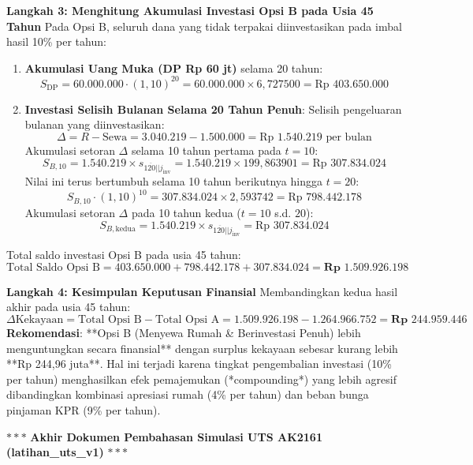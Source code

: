 \documentclass[11pt,a4paper]{article}
\newcommand{\angl}[1]{\overline{#1|}}
\begin{document}
\begin{solusibox}[6]
\textbf{Langkah 3: Menghitung Akumulasi Investasi Opsi B pada Usia 45 Tahun}  
Pada Opsi B, seluruh dana yang tidak terpakai diinvestasikan pada imbal hasil 10\% per tahun:
\begin{enumerate}[leftmargin=4mm, topsep=1pt, itemsep=1pt]
    \item \textbf{Akumulasi Uang Muka (DP Rp 60 jt)} selama 20 tahun:
    $$S_{\text{DP}} = 60.000.000 \cdot (1{,}10)^{20} = 60.000.000 \times 6{,}727500 = \text{Rp } 403.650.000$$
    \item \textbf{Investasi Selisih Bulanan Selama 20 Tahun Penuh}:  
    Selisih pengeluaran bulanan yang diinvestasikan:
    $$\Delta = R - \text{Sewa} = 3.040.219 - 1.500.000 = \text{Rp } 1.540.219 \text{ per bulan}$$
    Akumulasi setoran $\Delta$ selama 10 tahun pertama pada $t=10$:
    $$S_{B, 10} = 1.540.219 \times s_{\angl{120}|j_{\text{inv}}} = 1.540.219 \times 199{,}863901 = \text{Rp } 307.834.024$$
    Nilai ini terus bertumbuh selama 10 tahun berikutnya hingga $t=20$:
    $$S_{B, 10} \cdot (1{,}10)^{10} = 307.834.024 \times 2{,}593742 = \text{Rp } 798.442.178$$
    Akumulasi setoran $\Delta$ pada 10 tahun kedua ($t=10$ s.d. $20$):
    $$S_{B, \text{kedua}} = 1.540.219 \times s_{\angl{120}|j_{\text{inv}}} = \text{Rp } 307.834.024$$
\end{enumerate}
Total saldo investasi Opsi B pada usia 45 tahun:
$$\text{Total Saldo Opsi B} = 403.650.000 + 798.442.178 + 307.834.024 = \mathbf{\text{Rp } 1.509.926.198}$$

\textbf{Langkah 4: Kesimpulan Keputusan Finansial}  
Membandingkan kedua hasil akhir pada usia 45 tahun:
$$\Delta \text{Kekayaan} = \text{Total Opsi B} - \text{Total Opsi A} = 1.509.926.198 - 1.264.966.752 = \mathbf{\text{Rp } 244.959.446}$$
\textbf{Rekomendasi}: **Opsi B (Menyewa Rumah \& Berinvestasi Penuh) lebih menguntungkan secara finansial** dengan surplus kekayaan sebesar kurang lebih **Rp 244,96 juta**. Hal ini terjadi karena tingkat pengembalian investasi (10\% per tahun) menghasilkan efek pemajemukan (*compounding*) yang lebih agresif dibandingkan kombinasi apresiasi rumah (4\% per tahun) dan beban bunga pinjaman KPR (9\% per tahun).
\end{solusibox}

\vfill
\begin{center}
    \small\color{gray}
    $\ast\ast\ast$ \textbf{Akhir Dokumen Pembahasan Simulasi UTS AK2161 (latihan\_uts\_v1)} $\ast\ast\ast$
\end{center}
\end{document}
